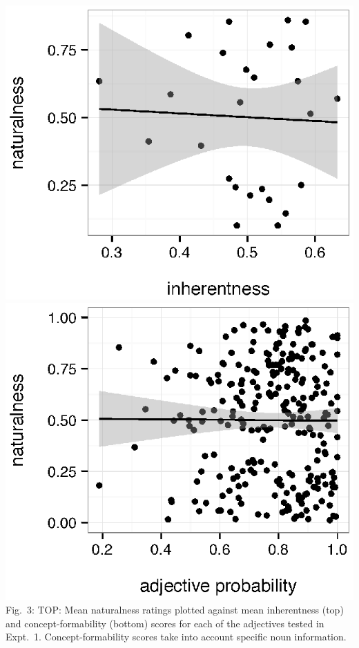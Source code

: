 \documentclass[10pt]{article}
\begin{document}
\begin{minipage}{.32\textwidth}
	\includegraphics[width=.95\linewidth]{plots/expt1-inherentness-naturalness.eps}%
	\\
	\includegraphics[width=.95\linewidth]{plots/naturalness-concept-noun-pred.eps}
	Fig.~3: TOP: Mean naturalness ratings plotted against mean inherentness  %
	(top) and concept-formability (bottom) scores for each of the adjectives tested
	in Expt.~1. Concept-formability scores take into account specific noun information.
\end{minipage}
\end{document}
